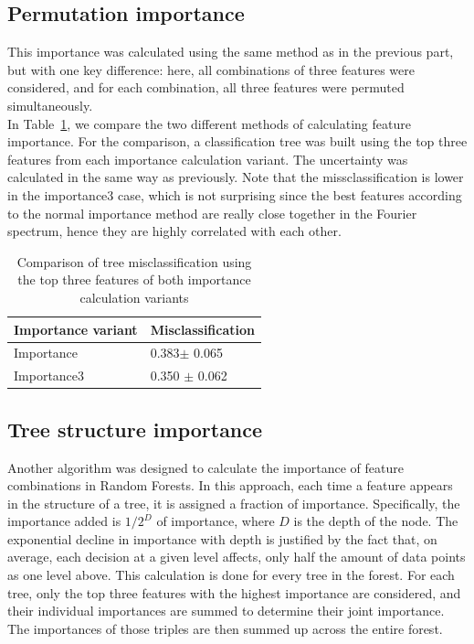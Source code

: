 \documentclass[9pt]{IEEEtran}
\begin{document}
\subsection{Permutation importance}
This importance was calculated using the same method as in the previous part, but with one key difference: 
here, all combinations of three features were considered, and for each combination, all three features were 
permuted simultaneously. 
\\
In Table~\ref{tab:results-importances}, we compare the two different methods of calculating 
feature importance. For the comparison, a classification tree was built using the top three features
 from each importance calculation variant. The uncertainty was calculated in the same way as previously. Note
  that the missclassification is lower in the importance3 case, which is not surprising since the best features 
  according to the normal importance method are really close together in the Fourier spectrum, hence they are 
  highly correlated with each other. 

\begin{table}[h]
    \centering
    \begin{tabular}{l|l}
        Importance variant                           & Misclassification           \\
        \hline
        Importance & 0.383$\pm$ 0.065                \\
        Importance3   & 0.350 $\pm$  0.062
    \end{tabular}
    \vspace{2px}
    \caption{Comparison of tree misclassification using the top three features of both importance calculation variants}
    \label{tab:results-importances}
\end{table}

\subsection{Tree structure importance}
Another algorithm was designed to calculate the importance of feature combinations in Random Forests.
 In this approach, each time a feature appears in the structure of a tree, it is assigned a fraction of 
 importance. Specifically, the importance added is $1/2^D$ of importance, where $D$ is the depth of the node.
 The exponential decline in importance with depth is justified by the fact that, on average, each decision 
 at a given level affects,  only half the amount of data points as one level above.
  This calculation is 
  done for every tree in the forest. For each tree, only the top three features with the highest importance
   are considered, and their individual importances are summed to determine their joint importance. The importances of 
   those triples are then summed up across the entire forest.
   \\
\end{document}
